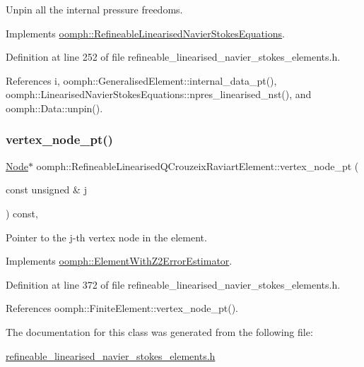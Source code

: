 Unpin all the internal pressure freedoms. 



Implements \hyperlink{classoomph_1_1RefineableLinearisedNavierStokesEquations_adb7699bbdef97e298a775f5f43b1f2a6}{oomph\+::\+Refineable\+Linearised\+Navier\+Stokes\+Equations}.



Definition at line 252 of file refineable\+\_\+linearised\+\_\+navier\+\_\+stokes\+\_\+elements.\+h.



References i, oomph\+::\+Generalised\+Element\+::internal\+\_\+data\+\_\+pt(), oomph\+::\+Linearised\+Navier\+Stokes\+Equations\+::npres\+\_\+linearised\+\_\+nst(), and oomph\+::\+Data\+::unpin().

\mbox{\label{classoomph_1_1RefineableLinearisedQCrouzeixRaviartElement_afa7b775f1f2a47c3c28fa61b77a34e4d}} 
\subsubsection{\texorpdfstring{vertex\+\_\+node\+\_\+pt()}{vertex\_node\_pt()}}
{\footnotesize\ttfamily \hyperlink{classoomph_1_1Node}{Node}$\ast$ oomph\+::\+Refineable\+Linearised\+Q\+Crouzeix\+Raviart\+Element\+::vertex\+\_\+node\+\_\+pt (\begin{DoxyParamCaption}\item[{const unsigned \&}]{j }\end{DoxyParamCaption}) const\hspace{0.3cm}{\ttfamily [inline]}, {\ttfamily [virtual]}}



Pointer to the j-\/th vertex node in the element. 



Implements \hyperlink{classoomph_1_1ElementWithZ2ErrorEstimator_a0eedccc33519f852c5dc2055ddf2774b}{oomph\+::\+Element\+With\+Z2\+Error\+Estimator}.



Definition at line 372 of file refineable\+\_\+linearised\+\_\+navier\+\_\+stokes\+\_\+elements.\+h.



References oomph\+::\+Finite\+Element\+::vertex\+\_\+node\+\_\+pt().



The documentation for this class was generated from the following file\+:\begin{DoxyCompactItemize}
\item 
\hyperlink{refineable__linearised__navier__stokes__elements_8h}{refineable\+\_\+linearised\+\_\+navier\+\_\+stokes\+\_\+elements.\+h}\end{DoxyCompactItemize}
